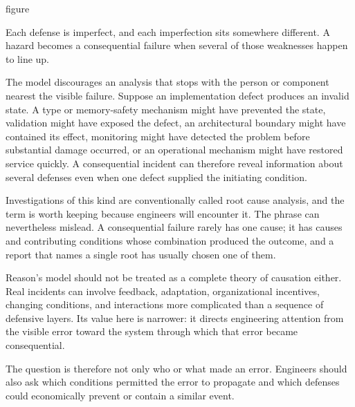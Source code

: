 \begin{bookbox}{figure}{} %
\pandocbounded{}

Each defense is imperfect, and each imperfection sits somewhere different. A hazard becomes a
consequential failure when several of those weaknesses happen to line up.
\end{bookbox}

The model discourages an analysis that stops with the person or component nearest the visible
failure. Suppose an implementation defect produces an invalid state. A type or memory-safety
mechanism might have prevented the state, validation might have exposed the defect, an
architectural boundary might have contained its effect, monitoring might have detected the problem
before substantial damage occurred, or an operational mechanism might have restored service
quickly. A consequential incident can therefore reveal information about several defenses even when
one defect supplied the initiating condition.

Investigations of this kind are conventionally called root cause analysis, and the term is worth
keeping because engineers will encounter it. The phrase can nevertheless mislead. A consequential
failure rarely has one cause; it has causes and contributing conditions whose combination produced
the outcome, and a report that names a single root has usually chosen one of them.

Reason's model should not be treated as a complete theory of causation either. Real incidents can
involve feedback, adaptation, organizational incentives, changing conditions, and interactions more
complicated than a sequence of defensive layers. Its value here is narrower: it directs engineering
attention from the visible error toward the system through which that error became consequential.

The question is therefore not only who or what made an error. Engineers should also ask which
conditions permitted the error to propagate and which defenses could economically prevent or
contain a similar event.

